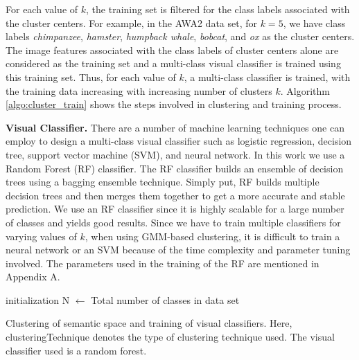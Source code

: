 \par
\medskip

For each value of $k$, the training set is filtered for the class labels associated with the cluster centers. For example, in the AWA2 data set, for $k = 5$, we have class labels \textit{chimpanzee}, \textit{hamster}, \textit{humpback whale}, \textit{bobcat}, and \textit{ox} as the cluster centers. The image features associated with the class labels of cluster centers alone are considered as the training set and a multi-class visual classifier is trained using this training set. Thus, for each value of $k$, a multi-class classifier is trained, with the training data increasing with increasing number of clusters $k$. Algorithm \ref{algo:cluster_train} shows the steps involved in clustering and training process.

\par
\medskip

\textbf{Visual Classifier.} There are a number of machine learning techniques one can employ to design a multi-class visual classifier such as logistic regression, decision tree, support vector machine (SVM), and neural network. In this work we use a Random Forest (RF) classifier. The RF classifier builds an ensemble of decision trees using a bagging ensemble technique. Simply put, RF builds multiple decision trees and then merges them together to get a more accurate and stable prediction. We use an RF classifier since it is highly scalable for a large number of classes and yields good results. Since we have to train multiple classifiers for varying values of $k$, when using GMM-based clustering, it is difficult to train a neural network or an SVM because of the time complexity and parameter tuning involved. The parameters used in the training of the RF are mentioned in Appendix A.
 
\par
\medskip

\begin{algorithm}[ht]
\SetAlgoLined
{}
 initialization\;
 N $\leftarrow$ Total number of classes in data set\;
 \caption{Clustering of semantic space and training of visual classifiers. Here, clusteringTechnique denotes the type of clustering technique used. The visual classifier used is a random forest.}
 \label{algo:cluster_train}
\end{algorithm}

